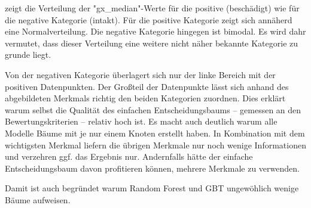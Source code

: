  zeigt die Verteilung der "gx\_median"-Werte für die positive (beschädigt) wie für die negative Kategorie (intakt). Für die positive Kategorie zeigt sich annäherd eine Normalverteilung. Die negative Kategorie hingegen ist bimodal. Es wird dahr vermutet, dass dieser Verteilung eine weitere nicht näher bekannte Kategorie zu grunde liegt.

Von der negativen Kategorie überlagert sich nur der linke Bereich mit der positiven Datenpunkten. Der Großteil der Datenpunkte lässt sich anhand des abgebildeten Merkmals richtig den beiden Kategorien zuordnen. Dies erklärt warum selbst die Qualität des einfachen Entscheidungsbaums -- gemessen an den Bewertungskriterien -- relativ hoch ist. Es macht auch deutlich warum alle Modelle Bäume mit je nur einem Knoten erstellt haben. In Kombination mit dem wichtigsten Merkmal liefern die übrigen Merkmale nur noch wenige Informationen und verzehren ggf. das Ergebnis nur. Andernfalls hätte der einfache Entscheidungsbaum davon profitieren können, mehrere Merkmale zu verwenden.

Damit ist auch begründet warum Random Forest und GBT ungewöhlich wenige Bäume aufweisen.